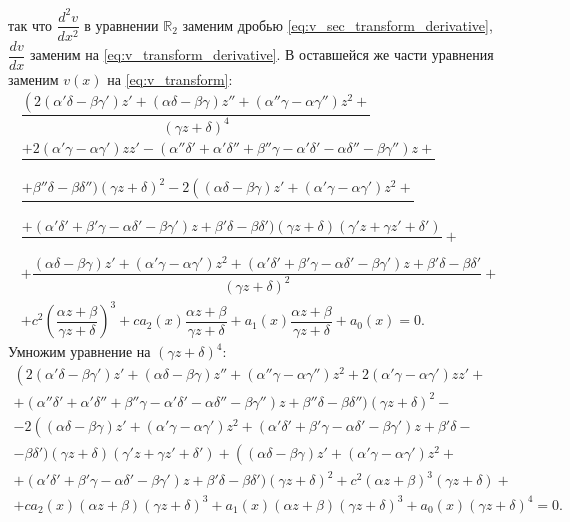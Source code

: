 так что $\dfrac{d^2v}{dx^2}$ в уравнении $\mathbb{R}_2$ заменим дробью \eqref{eq:v_sec_transform_derivative}, $\dfrac{dv}{dx}$ заменим на \eqref{eq:v_transform_derivative}. В оставшейся же части уравнения заменим $v(x)$ на \eqref{eq:v_transform}: 
\begin{multline*}
    \dfrac{\left( \right. 2 \left( \alpha' \delta - \beta \gamma' \right)z' + \left( \alpha \delta - \beta \gamma \right)z'' + \left( \alpha'' \gamma - \alpha \gamma''\right)z^{2} + }{\left( \gamma z + \delta \right)^4} \\ \dfrac{+ 2 \left( \alpha' \gamma - \alpha \gamma'\right)z z' - \left( \alpha'' \delta' + \alpha' \delta'' + \beta'' \gamma - \alpha' \delta' -\alpha \delta'' - \beta \gamma'' \right)z + }{} \\ \dfrac{ + \beta'' \delta -\beta \delta'' \big) (\gamma z + \delta)^2 - 2\left( (\alpha \delta - \beta \gamma)z' + (\alpha' \gamma - \alpha \gamma')z^{2} + \right.}{} \\ \dfrac{+ ( \alpha' \delta' + \beta' \gamma - \alpha \delta' - \beta \gamma')z + \beta' \delta  - \beta \delta' \big) \left( \gamma z +  \delta \right) \left( \gamma' z + \gamma z' +  \delta' \right)}{} + \\ +  \dfrac{\left( \alpha \delta - \beta \gamma \right)z' + \left( \alpha' \gamma - \alpha \gamma' \right)z^{2} + \left( \alpha' \delta' + \beta' \gamma - \alpha \delta' - \beta \gamma' \right)z + \beta' \delta - \beta \delta'}{\left( \gamma z + \delta \right)^2} + \\ + c^2 \left( \dfrac{\alpha z + \beta }{\gamma z + \delta} 
 \right)^3 + c a_2(x) \dfrac{\alpha z + \beta }{\gamma z + \delta}  + a_1(x) \dfrac{\alpha z + \beta }{\gamma z + \delta}  + a_0(x) = 0.
\end{multline*}
Умножим уравнение на $\left( \gamma z + \delta \right)^4$:
\begin{multline*}
    \left( \right. 2 \left( \alpha' \delta - \beta \gamma' \right)z' + \left( \alpha \delta - \beta \gamma \right)z'' + \left( \alpha'' \gamma - \alpha \gamma''\right)z^{2} + 2 \left( \alpha' \gamma - \alpha \gamma'\right)z z' + \\ + \left( \alpha'' \delta' + \alpha' \delta'' + \beta'' \gamma - \alpha' \delta' -\alpha \delta'' - \beta \gamma'' \right)z + \beta'' \delta -\beta \delta'' \big) (\gamma z + \delta)^2 - \\ - 2\left( (\alpha \delta - \beta \gamma)z' + (\alpha' \gamma - \alpha \gamma')z^{2} + \right. ( \alpha' \delta' + \beta' \gamma - \alpha \delta' - \beta \gamma')z + \beta' \delta - \\ - \beta \delta' \big) \left( \gamma z +  \delta \right) \left( \gamma' z + \gamma z' +  \delta' \right) +  \left( \right. \left( \alpha \delta - \beta \gamma \right)z' + \left( \alpha' \gamma - \alpha \gamma' \right)z^{2} + \\ + \left( \alpha' \delta' + \beta' \gamma - \alpha \delta' - \beta \gamma' \right)z + \beta' \delta - \beta \delta' \big) \left( \gamma z + \delta \right)^2 + c^2 \left( \alpha z + \beta \right)^3 (\gamma z + \delta) + \\ + c a_2(x) (\alpha z + \beta) (\gamma z + \delta)^3  + a_1(x) (\alpha z + \beta) (\gamma z + \delta)^3  + a_0(x) (\gamma z + \delta)^4 = 0.
\end{multline*}
